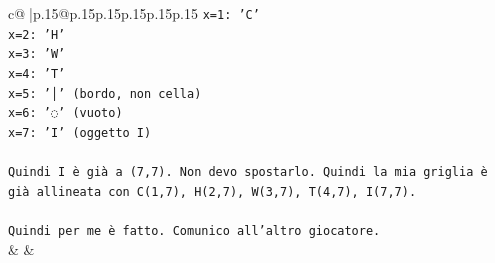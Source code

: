 \documentclass{article}
\begin{document}
{\begin{supertabular}{c@{$\;$}|p{.15\linewidth}@{}p{.15\linewidth}p{.15\linewidth}p{.15\linewidth}p{.15\linewidth}p{.15\linewidth}}
{{{\texttt{x=1: 'C'} \\
\texttt{x=2: 'H'} \\
\texttt{x=3: 'W'} \\
\texttt{x=4: 'T'} \\
\texttt{x=5: '│' (bordo, non cella)} \\
\texttt{x=6: '◌' (vuoto)} \\
\texttt{x=7: 'I' (oggetto I)} \\
\\ 
\texttt{Quindi I è già a (7,7). Non devo spostarlo. Quindi la mia griglia è già allineata con C(1,7), H(2,7), W(3,7), T(4,7), I(7,7).} \\
\\ 
\texttt{Quindi per me è fatto. Comunico all'altro giocatore.} \\
            }
        }
    }
    & & \\ \\


\end{supertabular}}
\end{document}
